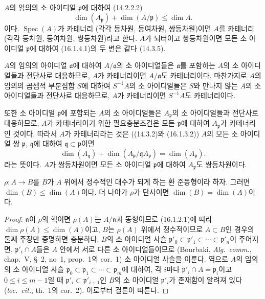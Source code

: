 \begin{env}[16.1.4]
\label{0.16.1.4-fr}
$A$의 임의의 소 아이디얼 $\mathfrak{p}$에 대하여 (14.2.2.2)
\[
\label{0.16.1.4.1-fr}
  \dim(A_{\mathfrak{p}})+\dim(A/\mathfrak{p})\leq\dim A.
\tag{16.1.4.1}
\]
이다. $\operatorname{Spec}(A)$가 카테너리 (각각 등차원,
등여차원, 쌍등차원)이면 $A$를 카테너리 (각각 등차원, 등여차원,
쌍등차원)라고 한다. $A$가 뇌터이고 쌍등차원이면 모든 소 아이디얼
$\mathfrak{p}$에 대하여 (16.1.4.1)의 두 변은 같다 (14.3.5).

$A$의 임의의 아이디얼 $\mathfrak{a}$에 대하여
$A/\mathfrak{a}$의 소 아이디얼들은 $\mathfrak{a}$를 포함하는
$A$의 소 아이디얼들과 전단사로 대응하므로, $A$가 카테너리이면
$A/\mathfrak{a}$도 카테너리이다. 마찬가지로 $A$의 임의의 곱셈적
부분집합 $S$에 대하여 $S^{-1}A$의 소 아이디얼들은 $S$와 만나지 않는
$A$의 소 아이디얼들과 전단사로 대응하므로, $A$가 카테너리이면
$S^{-1}A$도 카테너리이다.

또한 소 아이디얼 $\mathfrak{p}$에 포함되는 $A$의 소 아이디얼들은
$A_{\mathfrak{p}}$의 소 아이디얼들과 전단사로 대응하므로, $A$가
카테너리이기 위한 필요충분조건은 모든 $\mathfrak{p}$에 대하여
$A_{\mathfrak{p}}$가 카테너리인 것이다. 따라서 $A$가 카테너리라는
것은 ((14.3.2)와 (16.1.3.2)) $A$의 모든 소 아이디얼 쌍
$\mathfrak{p}$, $\mathfrak{q}$에 대하여
$\mathfrak{q}\subset\mathfrak{p}$이면
\[
\label{0.16.1.4.2-fr}
  \dim(A_{\mathfrak{q}})
  +\dim(A_{\mathfrak{p}}/\mathfrak{q}A_{\mathfrak{p}})
  =\dim(A_{\mathfrak{p}}).
\tag{16.1.4.2}
\]
라는 뜻이다. $A$가 쌍등차원이면 모든 소 아이디얼
$\mathfrak{p}$에 대하여 $A_{\mathfrak{p}}$도 쌍등차원이다.
\end{env}

\begin{proposition}[16.1.5]
\label{0.16.1.5-fr}
$\rho:A\to B$를 $B$가 $A$ 위에서 정수적인 대수가 되게 하는 환
준동형이라 하자. 그러면 $\dim(B)\leq\dim(A)$이다. 더 나아가
$\rho$가 단사이면 $\dim(B)=\dim(A)$이다.
\end{proposition}

\begin{proof}
$\mathfrak{n}$이 $\rho$의 핵이면 $\rho(A)$는 $A/\mathfrak{n}$과
동형이므로 (16.1.2.1)에 따라 $\dim\rho(A)\leq\dim(A)$이고, $B$는
$\rho(A)$ 위에서 정수적이므로 $A\subset B$인 경우의 둘째 주장만
증명하면 충분하다. $B$의 소 아이디얼 사슬
$\mathfrak{p}'_0\subset\mathfrak{p}'_1\subset\cdots\subset
\mathfrak{p}'_n$이 주어지면, $\mathfrak{p}'_i\cap A$들은 $A$ 안에서
서로 다른 소 아이디얼들이므로 (Bourbaki, \emph{Alg.~comm.}, chap.~V,
\S~2, no~1, prop.~1의 cor.~1) 소 아이디얼 사슬을 이룬다. 역으로
$A$의 임의의 소 아이디얼 사슬
$\mathfrak{p}_0\subset\mathfrak{p}_1\subset\cdots\subset
\mathfrak{p}_m$에 대하여, 각 $i$마다
$\mathfrak{p}'_i\cap A=\mathfrak{p}_i$이고 $0\leq i\leq m-1$일 때
$\mathfrak{p}'_i\subset\mathfrak{p}'_{i+1}$인 $B$의 소 아이디얼
$\mathfrak{p}'_i$가 존재함이 알려져 있다 (\emph{loc.~cit.}, th.~1의
cor.~2). 이로부터 결론이 따른다.
\end{proof}

